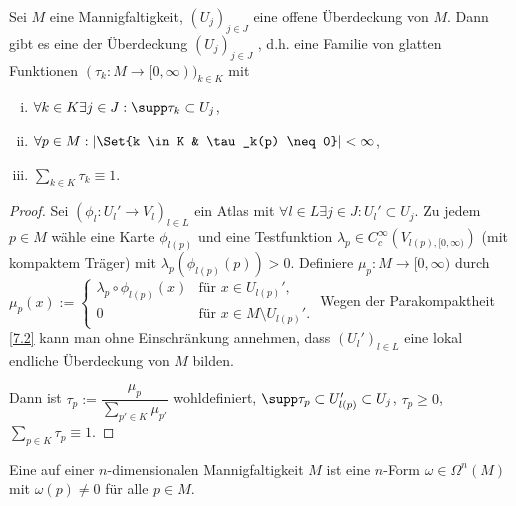 \begin{st} \label{7.3}
    Sei $M$ eine Mannigfaltigkeit, $(U_j)_{j\in J}$ eine offene Überdeckung von $M$.
    Dann gibt es eine der Überdeckung $(U_j)_{j \in J}$ , d.h. eine Familie von glatten Funktionen $(\tau_k: M \to [0, \infty))_{k \in K}$ mit
    \begin{enumerate}[(i)]
        \item
            $\forall k \in K \exists j \in J: \supp \tau_k \subset U_j$,
        \item
            $\forall p \in M: |\Set{k \in K & \tau_k(p) \neq 0}| < \infty$,
        \item
            $\sum_{k \in K} \tau_k \equiv 1$.
    \end{enumerate}
    \begin{proof}
        Sei $(\phi_l: U_l' \to V_l)_{l \in L}$ ein Atlas mit $\forall l \in L \exists j \in J: U_l' \subset U_j$.
        Zu jedem $p \in M$ wähle eine Karte $\phi_{l(p)}$ und eine Testfunktion $\lambda_p \in C_c^\infty(V_{l(p), [0,\infty)})$ (mit kompaktem Träger) mit $\lambda_p(\phi_{l(p)}(p)) > 0$.
        Definiere $\mu_p: M \to [0, \infty)$ durch
        \begin{math}
            \mu_p(x) := \begin{cases}
                \lambda_p \circ \phi_{l(p)}(x) & \text{für $x \in U_{l(p)}'$}, \\
                0 & \text{für $x \in M \setminus U_{l(p)}'$}.
            \end{cases}
        \end{math}
        Wegen der Parakompaktheit \ref{7.2} kann man ohne Einschränkung annehmen, dass $(U_l')_{l \in L}$ eine lokal endliche Überdeckung von $M$ bilden.

        Dann ist
        \begin{math}
            \tau_p := \dfrac{\mu_p}{\sum_{p' \in K} \mu_{p'}}
        \end{math}
        wohldefiniert, $\supp \tau_p \subset U_{l(p)}' \subset U_j$,
        $\tau_p \ge 0$, $\sum_{p \in K} \tau_p \equiv 1$.
    \end{proof}
\end{st}

\begin{df} \label{7.4}
    Eine  auf einer $n$-dimensionalen Mannigfaltigkeit $M$ ist eine $n$-Form $\omega \in \Omega^n(M)$ mit $\omega(p) \neq 0$ für alle $p \in M$.
\end{df}

